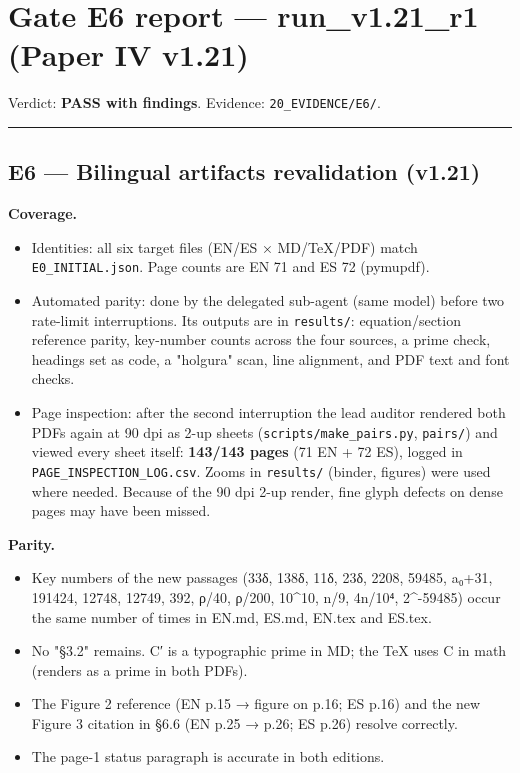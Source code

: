 \documentclass[
]{article}
\author{}
\date{}
\providecommand{\tightlist}{%
  \setlength{\itemsep}{0pt}\setlength{\parskip}{0pt}}
\begin{document}
\section{Gate E6 report --- run\_v1.21\_r1 (Paper IV
v1.21)}\label{gate-e6-report--run_v121_r1-paper-iv-v121}

Verdict: \textbf{PASS with findings}. Evidence:
\texttt{20\_EVIDENCE/E6/}.

\begin{center}\rule{0.5\linewidth}{0.5pt}\end{center}

\subsection{E6 --- Bilingual artifacts revalidation
(v1.21)}\label{e6--bilingual-artifacts-revalidation-v121}

\textbf{Coverage.}

\begin{itemize}
\tightlist
\item
  Identities: all six target files (EN/ES × MD/TeX/PDF) match
  \texttt{E0\_INITIAL.json}. Page counts are EN 71 and ES 72 (pymupdf).
\item
  Automated parity: done by the delegated sub-agent (same model) before
  two rate-limit interruptions. Its outputs are in \texttt{results/}:
  equation/section reference parity, key-number counts across the four
  sources, a prime check, headings set as code, a "holgura" scan, line
  alignment, and PDF text and font checks.
\item
  Page inspection: after the second interruption the lead auditor
  rendered both PDFs again at 90 dpi as 2-up sheets
  (\texttt{scripts/make\_pairs.py}, \texttt{pairs/}) and viewed every
  sheet itself: \textbf{143/143 pages} (71 EN + 72 ES), logged in
  \texttt{PAGE\_INSPECTION\_LOG.csv}. Zooms in \texttt{results/}
  (binder, figures) were used where needed. Because of the 90 dpi 2-up
  render, fine glyph defects on dense pages may have been missed.
\end{itemize}

\textbf{Parity.}

\begin{itemize}
\tightlist
\item
  Key numbers of the new passages (33δ, 138δ, 11δ, 23δ, 2208, 59485,
  a₀+31, 191424, 12748, 12749, 392, ρ/40, ρ/200, 10\^{}10, n/9, 4n/10⁴,
  2\^{}-59485) occur the same number of times in EN.md, ES.md, EN.tex
  and ES.tex.
\item
  No "§3.2" remains. C′ is a typographic prime in MD; the TeX uses
  C\textquotesingle{} in math (renders as a prime in both PDFs).
\item
  The Figure 2 reference (EN p.15 → figure on p.16; ES p.16) and the new
  Figure 3 citation in §6.6 (EN p.25 → p.26; ES p.26) resolve correctly.
\item
  The page-1 status paragraph is accurate in both editions.
\end{itemize}
\end{document}

